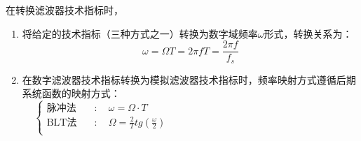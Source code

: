 \documentclass[notheorems,compress,mathserif,table]{beamer}
\begin{document}
\begin{frame}[shrink]\frametitle{}%

在转换滤波器技术指标时，
\begin{enumerate}
  \item 将给定的技术指标（三种方式之一）转换为数字域频率$\omega$形式，转换关系为：
     $$\omega = \Omega T = 2\pi f T = \frac{2\pi f}{f_s}$$
  \item 在数字滤波器技术指标转换为模拟滤波器技术指标时，频率映射方式遵循后期系统函数的映射方式：
      $$
      \left\{ \begin{aligned}
        \mbox{脉冲法}     &\quad  :\quad \omega = \Omega \cdot T
                            \quad\quad\quad\quad\quad\quad\quad\quad
        \quad\quad\quad\quad\quad\quad\quad\quad\quad\quad\quad\quad\\
        \mbox{BLT法}  &\quad :\quad \Omega = \frac{2}{T}tg(\frac{\omega}{2})\\
      \end{aligned} \right.
    $$

\end{enumerate}
\end{frame}
\end{document}
